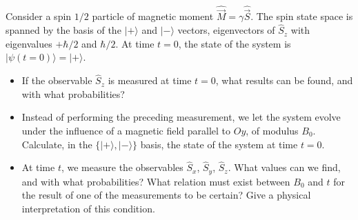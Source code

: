 \documentclass[12pt,a4paper]{article}
\newenvironment{problem}[2][Problem]{\begin{trivlist}
\item[\hskip \labelsep {\bfseries #1}\hskip \labelsep {\bfseries #2.}]}{\end{trivlist}}
\begin{document}
\begin{problem}{1}
[C-T Exercise 4-1] Consider a spin $1/2$ particle of magnetic moment $\hat{\vec{M}}=\gamma\hat{\vec{S}}$. The spin state space is spanned by the basis of the $|+\rangle$ and $|-\rangle$ vectors, eigenvectors of $\hat{S}_z$ with eigenvalues $+\hbar/2$ and $\hbar/2$. At time $t=0$, the state of the system is $|\psi(t=0)\rangle=|+\rangle$.
\begin{itemize}
\item[(a)] If the observable $\hat{S}_z$ is measured at time $t=0$, what results can be found, and with what probabilities?
\item[(b)] Instead of performing the preceding measurement, we let the system evolve under the influence of a magnetic field parallel to $Oy$, of modulus $B_0$. Calculate, in the $\{|+\rangle,|-\rangle\}$ basis, the state of the system at time $t=0$.
\item[(c)] At time $t$, we measure the observables $\hat{S}_x$, $\hat{S}_y$, $\hat{S}_z$. What values can we find, and with what probabilities? What relation must exist between $B_0$ and $t$ for the result of one of the measurements to be certain? Give a physical interpretation of this condition.
\end{itemize}
\end{problem}
\end{document}
